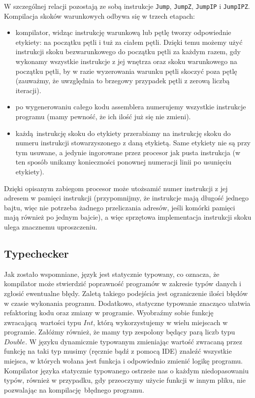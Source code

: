 W szczególnej relacji pozostają ze sobą instrukcje \texttt{Jump}, \texttt{JumpZ}, \texttt{JumpIP} i \texttt{JumpIPZ}. Kompilacja skoków warunkowych odbywa się w trzech etapach:
\begin{itemize}
  \item kompilator, widząc instrukcję warunkową lub pętlę tworzy odpowiednie etykiety: na początku pętli i tuż za ciałem pętli. Dzięki temu możemy użyć instrukcji skoku bezwarunkowego do początku pętli za każdym razem, gdy wykonamy wszystkie instrukcje z jej wnętrza oraz skoku warunkowego na początku pętli, by w razie wyzerowania warunku pętli skoczyć poza pętlę (zauważmy, że uwzględnia to brzegowy przypadek pętli z zerową liczbą iteracji).
  \item po wygenerowaniu całego kodu assemblera numerujemy wszystkie instrukcje programu (mamy pewność, że ich ilość już się nie zmieni).
  \item każdą instrukcję skoku do etykiety przerabiamy na instrukcję skoku do numeru instrukcji stowarzyszonego z daną etykietą. Same etykiety nie są przy tym usuwane, a jedynie ingorowane przez procesor jak pusta instrukcja (w ten sposób unikamy konieczności ponownej numeracji linii po usunięciu etykiety).
\end{itemize}

Dzięki opisanym zabiegom procesor może utożsamić numer instrukcji z jej adresem w pamięci instrukcji (przypomnijmy, że instrukcje mają długość jednego bajtu, więc nie potrzeba żadnego przeliczania adresów, jeśli komórki pamięci mają również po jednym bajcie), a więc sprzętowa implementacja instrukcji skoku ulega znacznemu uproszczeniu.

\subsection{Typechecker}

Jak zostało wspomniane, język jest statycznie typowany, co oznacza, że kompilator może stwierdzić poprawność programów w zakresie typów danych i zgłosić ewentualne błędy. Zaletą takiego podejścia jest ograniczenie ilości błędów w czasie wykonania programu. Dodatkowo, statyczne typowanie znacząco ułatwia refaktoring kodu oraz zmiany w programie. Wyobraźmy sobie funkcję zwracającą wartości typu $Int$, którą wykorzystujemy w wielu miejscach w programie. Załóżmy również, że mamy typ zespolony będący parą liczb typu $Double$. W języku dynamicznie typowanym zmieniając wartość zwracaną przez funkcję na taki typ musimy (ręcznie bądź z pomocą IDE) znaleźć wszystkie miejsca, w których wołana jest funkcja i odpowiednio zmienić logikę programu. Kompilator języka statycznie typowanego ostrzeże nas o każdym niedopasowaniu typów, również w przypadku, gdy przeoczymy użycie funkcji w innym pliku, nie pozwalając na kompilację błędnego programu.

